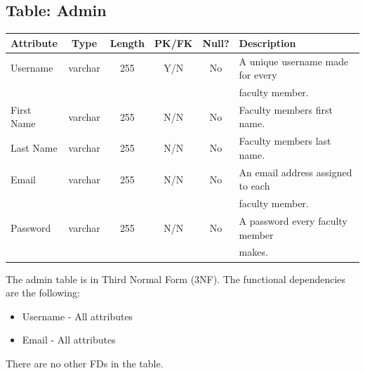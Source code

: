 \documentclass[letterpaper,12pt,oneside,listof=totoc]{scrreprt}
\begin{document}
\subsection{Table: Admin}
\begin{table}[h]
    \centering
    \begin{tabular}{|l|c|c|c|c|l|}
        \hline
        \textbf{Attribute} & \textbf{Type} & \textbf{Length} & \textbf{PK/FK} & \textbf{Null?} & \textbf{Description}
        \\
        \hline
         Username & varchar & 255 & Y/N & No & A unique username made for every \\ &&&&& faculty member.
        \\
        \hline
        First Name & varchar & 255 & N/N & No & Faculty members first name.
        \\
        \hline
        Last Name & varchar & 255 & N/N & No & Faculty members last name.
        \\
        \hline
        Email & varchar & 255 & N/N & No & An email address assigned to each \\ &&&&& faculty member.
        \\
        \hline
        Password & varchar & 255 & N/N & No & A password every faculty member \\ &&&&& makes. 
        \\
        \hline
    \end{tabular}
\end{table}

The admin table is in Third Normal Form (3NF). The functional dependencies are the following:
\begin{itemize}
  \item Username - All attributes
  \item Email - All attributes
\end{itemize}
There are no other FDs in the table.
\end{document}
